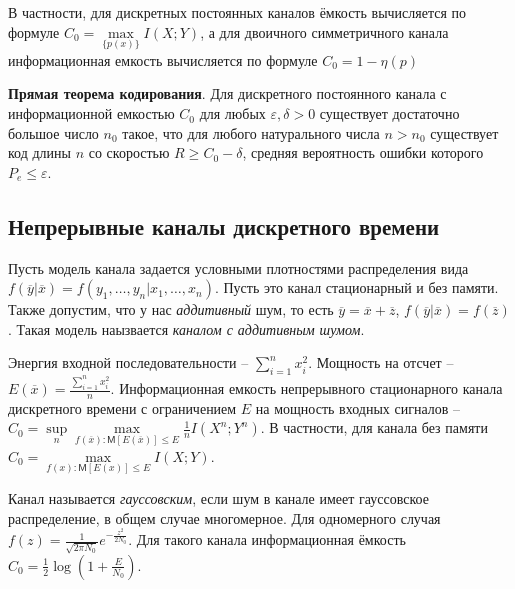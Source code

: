 \documentclass[a4paper,12pt]{article}
\newcommand{\MExpect}{\mathsf{M}}
\begin{document}
В частности, для дискретных постоянных каналов ёмкость вычисляется по формуле $C_0=\max\limits_{\{p(x)\}}I(X;Y)$, а для двоичного симметричного канала информационная емкость вычисляется по формуле $C_0=1-\eta(p)$

\textbf{Прямая теорема кодирования}. Для дискретного постоянного канала с информационной емкостью $C_0$ для любых $\varepsilon,\delta>0$ существует достаточно большое число $n_0$ такое, что для любого натурального числа $n>n_0$ существует код длины $n$ со скоростью $R\ge C_0-\delta$, средняя вероятность ошибки которого $P_e\le\varepsilon$.

\subsection*{Непрерывные каналы дискретного времени}

Пусть модель канала задается условными плотностями распределения вида $f(\overline y|\overline x)=f(y_1,\dots,y_n|x_1,\dots,x_n)$. Пусть это канал стационарный и без памяти. Также допустим, что у нас \textit{аддитивный} шум, то есть $\overline y = \overline x + \overline z$, $f(\overline y|\overline x)=f(\overline z)$. Такая модель наызвается \textit{каналом с аддитивным шумом}.

Энергия входной последовательности -- $\sum\limits_{i=1}^{n}x_i^2$. Мощность на отсчет -- $E(\overline x)=\frac{\sum\limits_{i=1}^{n}x_i^2}{n}$. Информационная емкость непрерывного стационарного канала дискретного времени с ограничением $E$ на мощность входных сигналов -- $C_0=\sup\limits_n\max\limits_{f(\overline x):\MExpect [E(\overline x)]\le E} \frac{1}{n}I(X^n;Y^n)$. В частности, для канала без памяти $C_0=\max\limits_{f(x):\MExpect [E(x)]\le E}I(X;Y)$.

Канал называется \textit{гауссовским}, если шум в канале имеет гауссовское распределение, в общем случае многомерное. Для одномерного случая $f(z)=\frac{1}{\sqrt{2\pi N_0}}e^{-\frac{z^2}{2N_0}}$. Для такого канала информационная ёмкость $C_0=\frac{1}{2}\log(1+\frac{E}{N_0})$.
\end{document}
